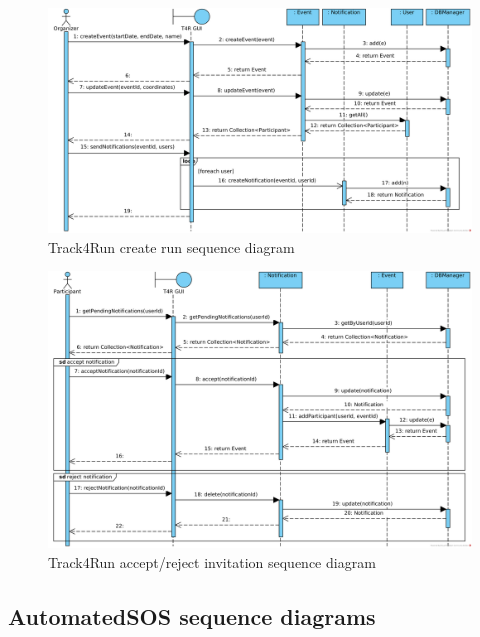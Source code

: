 \documentclass[a4paper, hidelinks, 12pt]{report}
\begin{document}
	\begin{figure}[H]
		\centering
		\includegraphics[width=1\textwidth]{diagrams/sequence_diagrams/t4r_create_run.png}
		\caption[Track4Run create run sequence diagram]{Track4Run create run sequence diagram}
		\label{fig:t4r_seq_create_run}
	\end{figure}

	\begin{figure}[H]
		\centering
		\includegraphics[width=1\textwidth]{diagrams/sequence_diagrams/t4r_accept_reject_notification.png}
		\caption[Track4Run accept/reject invitation sequence diagram]{Track4Run accept/reject invitation sequence diagram}
		\label{fig:t4r_seq_accept_invitation}
	\end{figure}	
	
	\subsection{AutomatedSOS sequence diagrams}
\end{document}
